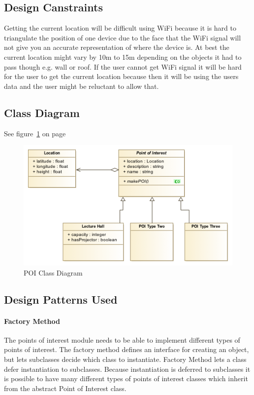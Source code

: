 \subsection{Design Canstraints}
Getting the current location will be difficult using WiFi because it is hard to triangulate the position of one device due to the face that the WiFi signal will not give you an accurate representation of where the device is. At best the current location might vary by 10m to 15m depending on the objects it had to pass though e.g. wall or roof. If the user cannot get WiFi signal it will be hard for the user to get the current location because then it will be using the users data and the user might be reluctant to allow that.

\subsection{Class Diagram}
See figure~\ref{fig:POI_Class_Diagram} on page~\pageref{fig:POI_Class_Diagram}
\begin{figure}
	\centering
	\includegraphics[scale=0.54]{POI/poi_class_diagram.png}
	\caption{POI Class Diagram}
	\label{fig:POI_Class_Diagram}
\end{figure}

\subsection{Design Patterns Used}
    \paragraph{Factory Method}
    The points of interest module needs to be able to implement different types of points of interest. The factory method defines an interface for creating an object, but lets subclasses decide which class to instantiate. Factory Method lets a class defer instantiation to subclasses. Because instantiation is deferred to subclasses it is possible to have many different types of points of interest classes which inherit from the abstract Point of Interest class.
 
